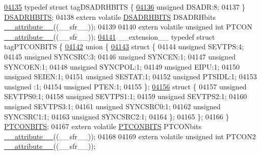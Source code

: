 \begin{DoxyCode}
\hypertarget{a00015_source_l04135}{}\hyperlink{a00014}{04135} \textcolor{keyword}{typedef} \textcolor{keyword}{struct }tagDSADRHBITS \{
\hypertarget{a00015_source_l04136}{}\hyperlink{a00014_ac838566a37b16a38ab17d17e307239e7}{04136}   \textcolor{keywordtype}{unsigned} DSADR:8;
04137 \} \hyperlink{a00014_dd/dfd/a00438}{DSADRHBITS};
04138 \textcolor{keyword}{extern} \textcolor{keyword}{volatile} \hyperlink{a00014_dd/dfd/a00438}{DSADRHBITS} DSADRHbits \hyperlink{a00015_a493c46f03454991ccc5aa7a6e1dfb2a7}{\_\_attribute\_\_}((\_\_sfr\_\_));
04139 
04140 \textcolor{keyword}{extern} \textcolor{keyword}{volatile} \textcolor{keywordtype}{unsigned} \textcolor{keywordtype}{int}  PTCON \hyperlink{a00015_a493c46f03454991ccc5aa7a6e1dfb2a7}{\_\_attribute\_\_}((\_\_sfr\_\_));
\hypertarget{a00015_source_l04141}{}\hyperlink{a00014}{04141} \_\_extension\_\_ \textcolor{keyword}{typedef} \textcolor{keyword}{struct }tagPTCONBITS \{
\hypertarget{a00015_source_l04142}{}\hyperlink{a00015}{04142}   \textcolor{keyword}{union }\{
\hypertarget{a00015_source_l04143}{}\hyperlink{a00015}{04143}     \textcolor{keyword}{struct }\{
04144       \textcolor{keywordtype}{unsigned} SEVTPS:4;
04145       \textcolor{keywordtype}{unsigned} SYNCSRC:3;
04146       \textcolor{keywordtype}{unsigned} SYNCEN:1;
04147       \textcolor{keywordtype}{unsigned} SYNCOEN:1;
04148       \textcolor{keywordtype}{unsigned} SYNCPOL:1;
04149       \textcolor{keywordtype}{unsigned} EIPU:1;
04150       \textcolor{keywordtype}{unsigned} SEIEN:1;
04151       \textcolor{keywordtype}{unsigned} SESTAT:1;
04152       \textcolor{keywordtype}{unsigned} PTSIDL:1;
04153       \textcolor{keywordtype}{unsigned} :1;
04154       \textcolor{keywordtype}{unsigned} PTEN:1;
04155     \};
\hypertarget{a00015_source_l04156}{}\hyperlink{a00015}{04156}     \textcolor{keyword}{struct }\{
04157       \textcolor{keywordtype}{unsigned} SEVTPS0:1;
04158       \textcolor{keywordtype}{unsigned} SEVTPS1:1;
04159       \textcolor{keywordtype}{unsigned} SEVTPS2:1;
04160       \textcolor{keywordtype}{unsigned} SEVTPS3:1;
04161       \textcolor{keywordtype}{unsigned} SYNCSRC0:1;
04162       \textcolor{keywordtype}{unsigned} SYNCSRC1:1;
04163       \textcolor{keywordtype}{unsigned} SYNCSRC2:1;
04164     \};
04165   \};
04166 \} \hyperlink{a00014_d0/d50/a00661}{PTCONBITS};
04167 \textcolor{keyword}{extern} \textcolor{keyword}{volatile} \hyperlink{a00014_d0/d50/a00661}{PTCONBITS} PTCONbits \hyperlink{a00015_a493c46f03454991ccc5aa7a6e1dfb2a7}{\_\_attribute\_\_}((\_\_sfr\_\_));
04168 
04169 \textcolor{keyword}{extern} \textcolor{keyword}{volatile} \textcolor{keywordtype}{unsigned} \textcolor{keywordtype}{int}  PTCON2 \hyperlink{a00015_a493c46f03454991ccc5aa7a6e1dfb2a7}{\_\_attribute\_\_}((\_\_sfr\_\_));

\end{DoxyCode}
